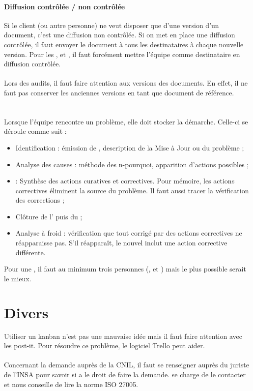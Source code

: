 \documentclass [a4paper] {article}
\begin{document}
\paragraph*{Diffusion contrôlée / non contrôlée}
Si le client (ou autre personne) ne veut disposer que d'une version d'un document, c'est une diffusion non contrôlée. Si on met en place une diffusion contrôlée, il faut envoyer le document à tous les destinataires à chaque nouvelle version. Pour les \DSE{}, \DSI{} et \PQ{}, il faut forcément mettre l'équipe comme destinataire en diffusion contrôlée.

\paragraph*{}
Lors des audits, il faut faire attention aux versions des documents. En effet, il ne faut pas conserver les anciennes versions en tant que document de référence.


\section{\FT}
Lorsque l'équipe rencontre un problème, elle doit stocker la démarche.  Celle-ci se déroule comme suit :

\begin{itemize}
\item Identification : émission de \FFT{}, description de la Mise à Jour ou du problème ;
\item Analyse des causes : méthode des n-pourquoi, apparition d'actions possibles ;
\item \OC : Synthèse des actions curatives et correctives. Pour mémoire, les actions correctives éliminent la source du problème. Il faut aussi tracer la vérification des corrections ;
\item Clôture de l'\OC{} puis du \FT{} ;
\item Analyse à froid : vérification que tout \FT{} corrigé par des actions correctives ne réapparaisse pas. S'il réapparaît, le nouvel \OC{} inclut une action corrective différente.
\end{itemize}

Pour une \CTFT{}, il faut au minimum trois personnes (\CP{}, \RQ{} et \RGC{}) mais le plus possible serait le mieux.


\section{Divers}

Utiliser un kanban n'est pas une mauvaise idée mais il faut faire attention avec les post-it. Pour résoudre ce problème, le logiciel Trello peut aider.

\paragraph*{}
Concernant la demande auprès de la CNIL, il faut se renseigner auprès du juriste de l'INSA pour savoir si \Sergi a le droit de faire la demande. \nomTuteurQualite se charge de le contacter et nous conseille de lire la norme ISO 27005.
\end{document}

